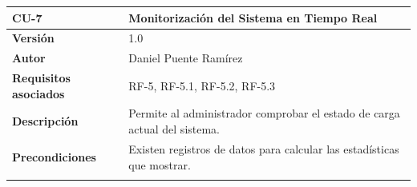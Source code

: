 \begin{longtable}[H]{@{}ll@{}}
\toprule
\begin{minipage}[b]{0.23\columnwidth}\raggedright\strut
\textbf{CU-7}\strut
\end{minipage} & \begin{minipage}[b]{0.71\columnwidth}\raggedright\strut
\textbf{Monitorización del Sistema en Tiempo Real}\strut
\end{minipage}\tabularnewline
\midrule
\endhead
\begin{minipage}[t]{0.23\columnwidth}\raggedright\strut
\textbf{Versión}\strut
\end{minipage} & \begin{minipage}[t]{0.71\columnwidth}\raggedright\strut
1.0\strut
\end{minipage}\tabularnewline
\begin{minipage}[t]{0.23\columnwidth}\raggedright\strut
\textbf{Autor}\strut
\end{minipage} & \begin{minipage}[t]{0.71\columnwidth}\raggedright\strut
Daniel Puente Ramírez\strut
\end{minipage}\tabularnewline
\begin{minipage}[t]{0.23\columnwidth}\raggedright\strut
\textbf{Requisitos asociados}\strut
\end{minipage} & \begin{minipage}[t]{0.71\columnwidth}\raggedright\strut
RF-5, RF-5.1, RF-5.2, RF-5.3\strut
\end{minipage}\tabularnewline
\begin{minipage}[t]{0.23\columnwidth}\raggedright\strut
\textbf{Descripción}\strut
\end{minipage} & \begin{minipage}[t]{0.71\columnwidth}\raggedright\strut
Permite al administrador comprobar el estado de carga actual del sistema.\strut
\end{minipage}\tabularnewline
\begin{minipage}[t]{0.23\columnwidth}\raggedright\strut
\textbf{Precondiciones}\strut
\end{minipage} & \begin{minipage}[t]{0.71\columnwidth}\raggedright\strut
Existen registros de datos para calcular las estadísticas que mostrar.\strut
\end{minipage}\tabularnewline
\begin{minipage}[t]{0.23\columnwidth}\raggedright\strut

\end{minipage}
\end{longtable}
